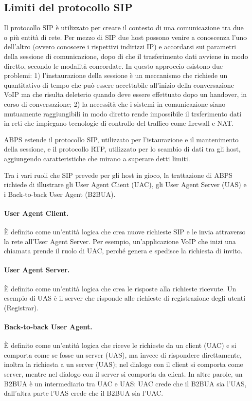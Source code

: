 \documentclass[12pt,a4paper,openright,twoside,draft]{book}
\begin{document}
\subsection{Limiti del protocollo SIP}

Il protocollo SIP è utilizzato per creare il contesto di una
comunicazione tra due o più entità di rete. Per mezzo di SIP due host
possono venire a conoscenza l'uno dell'altro (ovvero conoscere i
rispettivi indirizzi IP) e accordarsi sui parametri della sessione di
comunicazione, dopo di che il trasferimento dati avviene in modo
diretto, secondo le modalità concordate. In questo approccio esistono
due problemi: 1) l'instaurazione della sessione è un meccanismo che
richiede un quantitativo di tempo che può essere accettabile
all'inizio della conversazione VoIP ma che risulta deleterio quando
deve essere effettuato dopo un handover, in corso di conversazione; 2)
la necessità che i sistemi in comunicazione siano mutuamente
raggiungibili in modo diretto rende impossibile il trsferimento dati
in reti che impiegano tecnologie di controllo del traffico come
firewall e NAT.

ABPS estende il protocollo SIP, utilizzato per l'istaurazione e il
mantenimento della sessione, e il protocollo RTP, utilizzato per lo
scambio di dati tra gli host, aggiungendo caratteristiche che mirano a
superare detti limiti.

Tra i vari ruoli che SIP prevede per gli host in gioco, la trattazione
di ABPS richiede di illustrare gli User Agent Client (UAC), gli User
Agent Server (UAS) e i Back-to-back User Agent (B2BUA).

\paragraph{User Agent Client.}
È definito come un'entità logica che crea nuove richieste SIP e le
invia attraverso la rete all'User Agent Server. Per esempio,
un'applicazione VoIP che inizi una chiamata prende il ruolo di UAC,
perché genera e spedisce la richiesta di invito.

\paragraph{User Agent Server.}
È definito come un'entità logica che crea le risposte alla richieste
ricevute. Un esempio di UAS è il server che risponde alle richieste di
registrazione degli utenti (Registrar).

\paragraph{Back-to-back User Agent.}
È definito come un'entità logica che riceve le richieste da un client
(UAC) e si comporta come se fosse un server (UAS), ma invece di
rispondere direttamente, inoltra la richiesta a un server (UAS); nel
dialogo con il client si comporta come server, mentre nel dialogo con
il server si comporta da client. In altre parole, un B2BUA è un
intermediario tra UAC e UAS: UAC crede che il B2BUA sia l'UAS,
dall'altra parte l'UAS crede che il B2BUA sia l'UAC.
\end{document}
